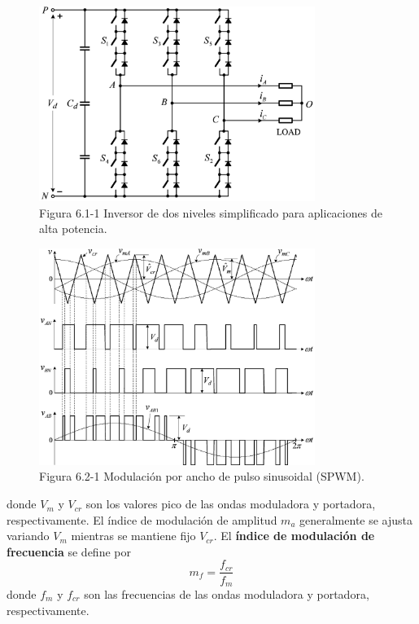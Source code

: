 \documentclass[letterpaper,12pt]{article}
\begin{document}
\begin{figure}[h]
	\centering
	\includegraphics[width=0.8\textwidth]{graficos/img61.jpg}
	\caption{Figura 6.1-1 Inversor de dos niveles simplificado para aplicaciones de alta potencia.}
\end{figure}
\FloatBarrier

\begin{figure}[h]
	\centering
	\includegraphics[width=0.8\textwidth]{graficos/img62.jpg}
	\caption{Figura 6.2-1 Modulación por ancho de pulso sinusoidal (SPWM).}
\end{figure}
\FloatBarrier

donde $V_m$ y $V_{cr}$ son los valores pico de las ondas moduladora y portadora, respectivamente. El índice de modulación de amplitud $m_a$ generalmente se ajusta variando $V_m$ mientras se mantiene fijo $V_{cr}$. El \textbf{índice de modulación de frecuencia} se define por
\[
	m_f = \frac{f_{cr}}{f_m}
\]
donde $f_m$ y $f_{cr}$ son las frecuencias de las ondas moduladora y portadora, respectivamente.
\end{document}
